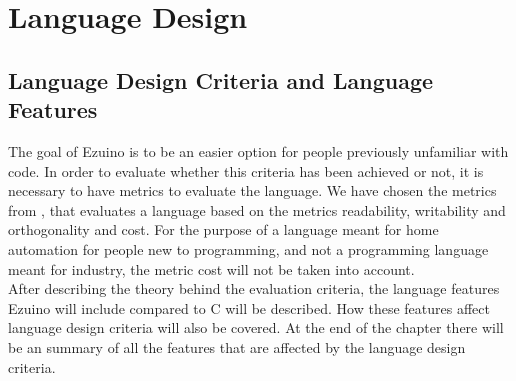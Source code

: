 \chapter{Language Design}\label{ch:langspec}
\section{Language Design Criteria and Language Features}
The goal of Ezuino is to be an easier option for people previously unfamiliar with code. In order to evaluate whether this criteria has been achieved or not, it is necessary to have metrics to evaluate the language. We have chosen the metrics from \cite{conceptsOfProgrammingLanguages}, that evaluates a language based on the metrics readability, writability and orthogonality and cost. For the purpose of a language meant for home automation for people new to programming, and not a programming language meant for industry, the metric cost will not be taken into account. \\
After describing the theory behind the evaluation criteria, the language features Ezuino will include compared to C will be described. How these features affect language design criteria will also be covered. At the end of the chapter there will be an summary of all the features that are affected by the language design criteria. 